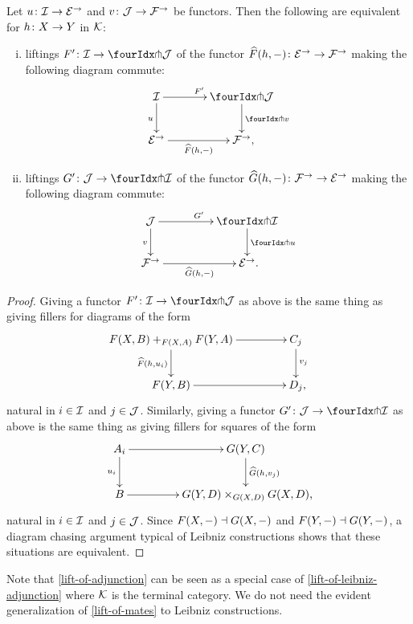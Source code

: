\documentclass[reqno,10pt,a4paper,oneside,draft]{amsart}
\begin{document}
\begin{proposition} \label{lift-of-leibniz-adjunction}
Let $u \co \cal{I} \to \catE^\to$ and $v \co \cal{J} \to \cal{F}^\to$ be functors.
Then the following are equivalent for $h \co X \to Y$ in $\cal{K}$:
\begin{enumerate}[(i)]
\item liftings $F' \co \cal{I} \to \liftl{\cal{J}}$ of the functor $\widehat{F}(h, \arghole) \co \catE^\to \to \cal{F}^\to$ making the following diagram commute:
\[
\xymatrix@C=1.2cm{
  \cal{I}
  \ar[r]^{F'}
  \ar[d]_{u}
&
  \liftl{\cal{J}}
  \ar[d]^{\liftl{v}}
\\
  \catE^\to
  \ar[r]_-{\widehat{F}(h, \arghole)}
&
  \cal{F}^\to
\rlap{,}}
\]
\item liftings $G' \co \cal{J} \to \liftr{\cal{I}}$ of the functor $\widehat{G}(h, \arghole) \co \cal{F}^\to \to \catE^\to$ making the following diagram commute:
\[
\xymatrix@C+2em{
  \cal{J}
  \ar[d]_{v}
  \ar[r]^{G'}
&
  \liftr{\cal{I}}
  \ar[d]^{\liftr{u}}
\\
  \cal{F}^\to
  \ar[r]_-{\widehat{G}(h, \arghole)}
&
  \catE^\to
\rlap{.}}
\]
\end{enumerate}
\end{proposition}

\begin{proof}
Giving a functor $F' \co \cal{I} \to \liftl{\cal{J}}$ as above is the same thing as giving fillers for diagrams of the form
\[
\xymatrix@C+2em{
  F(X,B) +_{F(X,A)} F(Y,A)
  \ar[d]_{\widehat{F}(h, u_i)}
  \ar[r]
&
  C_j
  \ar[d]^{v_j}
\\
  F(Y, B)
  \ar[r]
&
  D_j
\rlap{,}}
\]
natural in $i \in \cal{I}$ and $j \in \cal{J}$.
Similarly, giving a functor $G' \co \cal{J} \to \liftl{\cal{I}}$ as above is the same thing as giving fillers for squares of the form
\[
\xymatrix@C+2em{
  A_i
  \ar[d]_{u_i}
  \ar[r]
&
  G(Y, C)
  \ar[d]^{\widehat{G}(h, v_j)}
\\
  B
  \ar[r]
&
  G(Y, D) \times_{G(X,D)} G(X, D)
\rlap{,}}
\]
natural in $i \in \cal{I}$ and $j \in \cal{J}$.
Since $F(X, \arghole) \dashv G(X, \arghole)$ and $F(Y, \arghole) \dashv G(Y, \arghole)$, a diagram chasing argument typical of Leibniz constructions shows that these situations are
equivalent.
\end{proof}

Note that \cref{lift-of-adjunction} can be seen as a special case of \cref{lift-of-leibniz-adjunction} where $\cal{K}$ is the terminal category. We do not need  the evident generalization of \cref{lift-of-mates} to Leibniz constructions.
\end{document}
